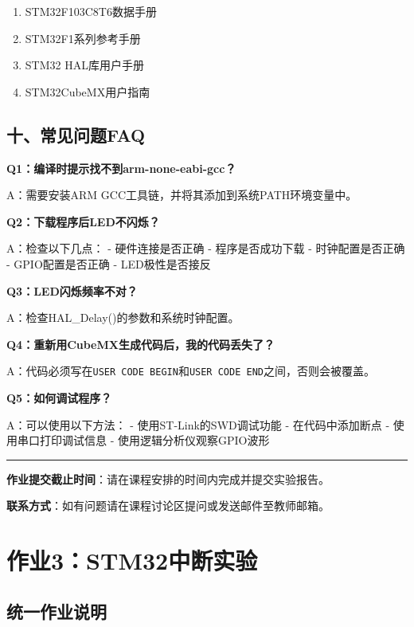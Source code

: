 \documentclass[
  chinese,
  UTF8,
  oneside,
  openany]{ctexbook}
\providecommand{\tightlist}{%
  \setlength{\itemsep}{0pt}\setlength{\parskip}{0pt}}
\begin{document}
\begin{enumerate}
\def\labelenumi{\arabic{enumi}.}
\tightlist
\item
  STM32F103C8T6数据手册
\item
  STM32F1系列参考手册
\item
  STM32 HAL库用户手册
\item
  STM32CubeMX用户指南
\end{enumerate}

\section{十、常见问题FAQ}\label{ux5341ux5e38ux89c1ux95eeux9898faq}

\textbf{Q1：编译时提示找不到arm-none-eabi-gcc？}

A：需要安装ARM GCC工具链，并将其添加到系统PATH环境变量中。

\textbf{Q2：下载程序后LED不闪烁？}

A：检查以下几点： - 硬件连接是否正确 - 程序是否成功下载 -
时钟配置是否正确 - GPIO配置是否正确 - LED极性是否接反

\textbf{Q3：LED闪烁频率不对？}

A：检查HAL\_Delay()的参数和系统时钟配置。

\textbf{Q4：重新用CubeMX生成代码后，我的代码丢失了？}

A：代码必须写在\texttt{USER\ CODE\ BEGIN}和\texttt{USER\ CODE\ END}之间，否则会被覆盖。

\textbf{Q5：如何调试程序？}

A：可以使用以下方法： - 使用ST-Link的SWD调试功能 - 在代码中添加断点 -
使用串口打印调试信息 - 使用逻辑分析仪观察GPIO波形

\begin{center}\rule{0.5\linewidth}{0.5pt}\end{center}

\textbf{作业提交截止时间}：请在课程安排的时间内完成并提交实验报告。

\textbf{联系方式}：如有问题请在课程讨论区提问或发送邮件至教师邮箱。

\chapter{作业3：STM32中断实验}\label{ux4f5cux4e1a3stm32ux4e2dux65adux5b9eux9a8c}

\section{统一作业说明}\label{ux7edfux4e00ux4f5cux4e1aux8bf4ux660e-2}
\end{document}
